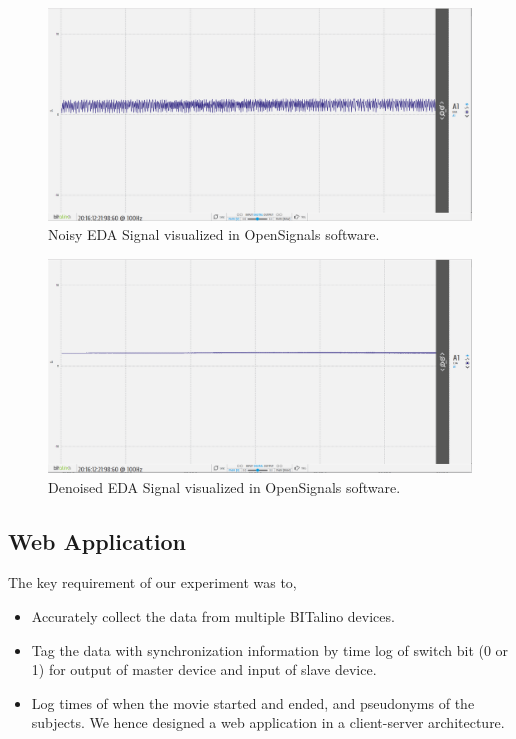 \begin{figure}
\centering
\includegraphics[width=130mm]{Figures/eda_noisy.PNG}
\caption{Noisy EDA Signal visualized in OpenSignals software.}
\label{fig:eda_noisy}
\end{figure}

\begin{figure}
\centering
\includegraphics[width=130mm]{Figures/eda_nonnoisy.PNG}
\caption{Denoised EDA Signal visualized in OpenSignals software.}
\label{fig:eda_nonnoisy}
\end{figure}

\subsection{Web Application}
\label{sec:custom_int}
The key requirement of our experiment was  to,
\begin{itemize}
    \item Accurately collect the data from multiple BITalino devices.
    \item Tag the data with synchronization information by time log of switch bit (0 or 1) for output of master device and input of slave device.
    \item Log times of when the movie started and ended, and pseudonyms of the subjects. We hence designed a web application in a client-server architecture.
\end{itemize}
